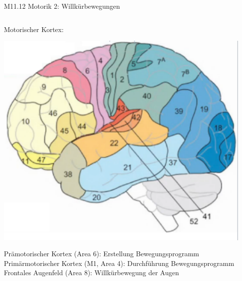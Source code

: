 \documentclass{beamer}
\begin{document}
\begin{frame}{M11.12 Motorik 2: Willkürbewegungen} 

\begin{columns}[c]

\begin{column}{5cm}
Motorischer Kortex:

\begin{center}
    \includegraphics[width=\textwidth]{cortex.png}
\end{center}


Prämotorischer Kortex (Area 6): Erstellung Bewegungsprogramm \\
Primärmotorischer Kortex (M1, Area 4): Durchführung Bewegungsprogramm \\ 
Frontales Augenfeld (Area 8): Willkürbewegung der Augen \\

\end{column}

\begin{column}{5cm}



\end{column}


\end{columns}

\end{frame}




\end{document}
